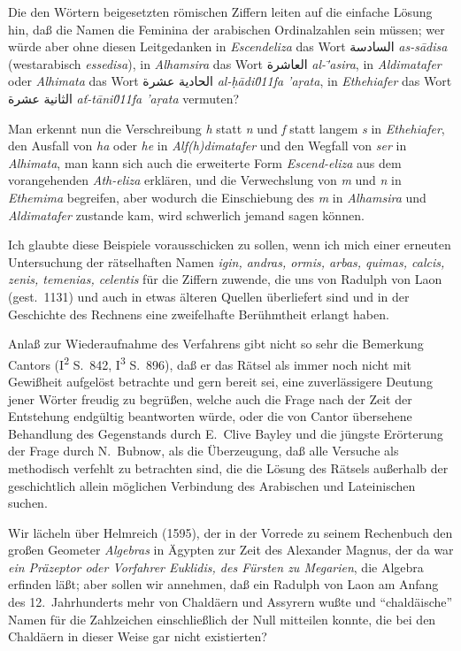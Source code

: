 \documentclass[11pt,a4paper]{article}
\newcommand{\RL}[1]{\beginR#1\endR}
\newcommand{\s}[1]{\d{#1}}     %
\newcommand{\ar}[1]{{\arabicfont\RL{#1}}}
\newcommand{\enquote}[1]{``#1''}
\begin{document}
Die den W\"ortern beigesetzten r\"omischen Ziffern leiten auf die einfache L\"osung hin, da\ss{} die Namen die Feminina der arabischen Ordinalzahlen sein m\"ussen; wer w\"urde aber ohne diesen Leitgedanken in \textit{Escendeliza} das Wort \ar{السادسة} \textit{as-s\=adisa} (westarabisch \textit{essedisa}), in \textit{Alhamsira} das Wort \ar{العاشرة} \textit{al-\='asira}, in \textit{Aldimatafer} oder \textit{Alhimata} das Wort \ar{الحادية عشرة} \textit{al-\d{h}\=adi\u011fa 'a\s{r}ata}, in \textit{Ethehiafer} das Wort \ar{الثانية عشرة} \textit{a\v{t}-t\=ani\u011fa 'a\s{r}ata} vermuten?

Man erkennt nun die Verschreibung \textit{h} statt \textit{n} und \textit{f} statt langem \textit{s} in \textit{Ethehiafer}, den Ausfall von \textit{ha} oder \textit{he} in \textit{Alf(h)dimatafer} und den Wegfall von \textit{ser} in \textit{Alhimata}, man kann sich auch die erweiterte Form \textit{Escend-eliza} aus dem vorangehenden \textit{Ath-eliza} erkl\"aren, und die Verwechslung von \textit{m} und \textit{n} in \textit{Ethemima} begreifen, aber wodurch die Einschiebung des \textit{m} in \textit{Alhamsira} und \textit{Aldimatafer} zustande kam, wird schwerlich jemand sagen k\"onnen.

Ich glaubte diese Beispiele vorausschicken zu sollen, wenn ich mich einer erneuten Untersuchung der r\"atselhaften Namen \textit{igin, andras, ormis, arbas, quimas, calcis, zenis, temenias, celentis} f\"ur die Ziffern zuwende, die uns von Radulph von Laon (gest.\ 1131) und auch in etwas \"alteren Quellen \"uberliefert sind und in der Geschichte des Rechnens eine zweifelhafte Ber\"uhmtheit erlangt haben.

Anla\ss{} zur Wiederaufnahme des Verfahrens gibt nicht so sehr die Bemerkung Cantors (I\textsuperscript{2} S.\ 842, I\textsuperscript{3} S.\ 896), da\ss{} er das R\"atsel als immer noch nicht mit Gewi\ss{}heit aufgel\"ost betrachte und gern bereit sei, eine zuverl\"assigere Deutung jener W\"orter freudig zu begr\"u\ss{}en, welche auch die Frage nach der Zeit der Entstehung endg\"ultig beantworten w\"urde, oder die von Cantor \"ubersehene Behandlung des Gegenstands durch E.\ Clive Bayley und die j\"ungste Er\"orterung der Frage durch N.\ Bubnow, als die \"Uberzeugung, da\ss{} alle Versuche als methodisch verfehlt zu betrachten sind, die die L\"osung des R\"atsels au\ss{}erhalb der geschichtlich allein m\"oglichen Verbindung des Arabischen und Lateinischen suchen.

Wir l\"acheln \"uber Helmreich (1595), der in der Vorrede zu seinem Rechenbuch den gro\ss{}en Geometer \textit{Algebras} in \"Agypten zur Zeit des Alexander Magnus, der da war \textit{ein Pr\"azeptor oder Vorfahrer Euklidis, des F\"ursten zu Megarien}, die Algebra erfinden l\"a\ss{}t; aber sollen wir annehmen, da\ss{} ein Radulph von Laon am Anfang des 12.\ Jahrhunderts mehr von Chald\"aern und Assyrern wu\ss{}te und \enquote{chald\"aische} Namen f\"ur die Zahlzeichen einschlie\ss{}lich der Null mitteilen konnte, die bei den Chald\"aern in dieser Weise gar nicht existierten?
\end{document}
